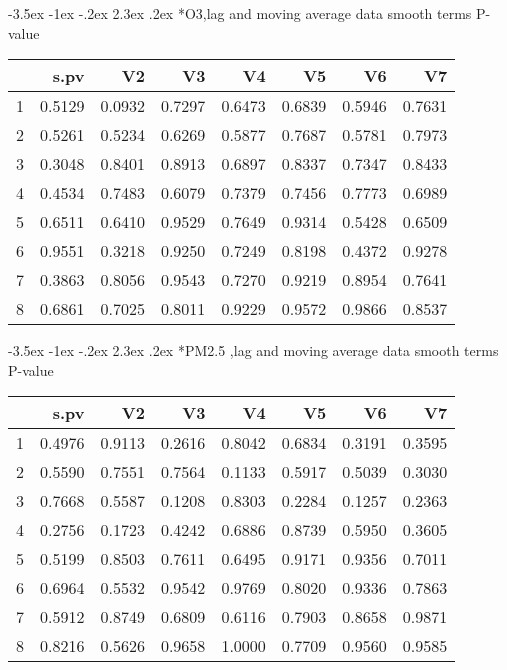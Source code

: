 \documentclass[a4paper, 12pt]{article}
\makeatletter
\def\Large{\fontsize{16}{24}\selectfont}
\renewcommand\section{\@startsection {section}{1}{\z@}%
                                   {-3.5ex \@plus -1ex \@minus -.2ex}%
                                   {2.3ex \@plus.2ex}%
                                   {\centering\normalfont\Large\bfseries}}
\makeatother
\begin{document}
\section*{O3,lag and moving average data}
smooth terms P-value
\begin{table}[ht]
\centering
\begin{tabular}{rrrrrrrr}
  \hline
 & s.pv & V2 & V3 & V4 & V5 & V6 & V7 \\
  \hline
1 & 0.5129 & 0.0932 & 0.7297 & 0.6473 & 0.6839 & 0.5946 & 0.7631 \\
  2 & 0.5261 & 0.5234 & 0.6269 & 0.5877 & 0.7687 & 0.5781 & 0.7973 \\
  3 & 0.3048 & 0.8401 & 0.8913 & 0.6897 & 0.8337 & 0.7347 & 0.8433 \\
  4 & 0.4534 & 0.7483 & 0.6079 & 0.7379 & 0.7456 & 0.7773 & 0.6989 \\
  5 & 0.6511 & 0.6410 & 0.9529 & 0.7649 & 0.9314 & 0.5428 & 0.6509 \\
  6 & 0.9551 & 0.3218 & 0.9250 & 0.7249 & 0.8198 & 0.4372 & 0.9278 \\
  7 & 0.3863 & 0.8056 & 0.9543 & 0.7270 & 0.9219 & 0.8954 & 0.7641 \\
  8 & 0.6861 & 0.7025 & 0.8011 & 0.9229 & 0.9572 & 0.9866 & 0.8537 \\
   \hline
\end{tabular}
\end{table}
\clearpage
\section*{PM2.5 ,lag and moving average data}
smooth terms P-value
\begin{table}[ht]
\centering
\begin{tabular}{rrrrrrrr}
  \hline
 & s.pv & V2 & V3 & V4 & V5 & V6 & V7 \\
  \hline
1 & 0.4976 & 0.9113 & 0.2616 & 0.8042 & 0.6834 & 0.3191 & 0.3595 \\
  2 & 0.5590 & 0.7551 & 0.7564 & 0.1133 & 0.5917 & 0.5039 & 0.3030 \\
  3 & 0.7668 & 0.5587 & 0.1208 & 0.8303 & 0.2284 & 0.1257 & 0.2363 \\
  4 & 0.2756 & 0.1723 & 0.4242 & 0.6886 & 0.8739 & 0.5950 & 0.3605 \\
  5 & 0.5199 & 0.8503 & 0.7611 & 0.6495 & 0.9171 & 0.9356 & 0.7011 \\
  6 & 0.6964 & 0.5532 & 0.9542 & 0.9769 & 0.8020 & 0.9336 & 0.7863 \\
  7 & 0.5912 & 0.8749 & 0.6809 & 0.6116 & 0.7903 & 0.8658 & 0.9871 \\
  8 & 0.8216 & 0.5626 & 0.9658 & 1.0000 & 0.7709 & 0.9560 & 0.9585 \\
   \hline
\end{tabular}
\end{table}
\clearpage
\end{document}
